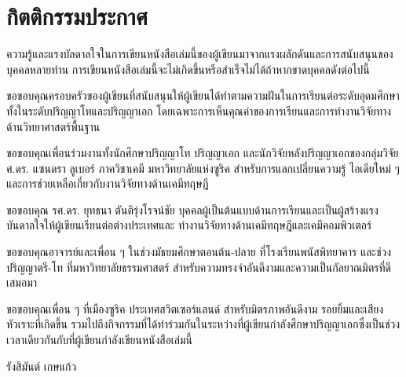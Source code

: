 

{

\chapter*{\centering กิตติกรรมประกาศ}

ความรู้และแรงบัลดาลใจในการเขียนหนังสือเล่มนี้ของผู้เขียนมาจากแรงผลักดันและการสนับสนุนของบุคคลหลายท่าน 
การเขียนหนังสือเล่มนี้จะไม่เกิดขึ้นหรือสำเร็จไม่ได้ถ้าหากขาดบุคคลดังต่อไปนี้

ขอขอบคุณครอบครัวของผู้เขียนที่สนับสนุนให้ผู้เขียนได้ทำตามความฝันในการเรียนต่อระดับอุดมศึกษา ทั้งในระดับปริญญาโทและปริญญาเอก 
โดยเฉพาะการเห็นคุณค่าของการเรียนและการทำงานวิจัยทางด้านวิทยาศาสตร์พื้นฐาน

ขอขอบคุณเพื่อนร่วมงานทั้งนักศึกษาปริญญาโท ปริญญาเอก และนักวิจัยหลังปริญญาเอกของกลุ่มวิจัย ศ.ดร. แซนดรา ลูเบอร์ ภาควิชาเคมี
มหาวิทยาลัยแห่งซูริค สำหรับการแลกเปลี่ยนความรู้ ไอเดียใหม่ ๆ และการช่วยเหลือเกี่ยวกับงานวิจัยทางด้านเคมีทฤษฎี

ขอขอบคุณ รศ.ดร. ยุทธนา ตันติรุ่งโรจน์ชัย บุคคลผู้เป็นต้นแบบด้านการเรียนและเป็นผู้สร้างแรงบันดาลใจให้ผู้เขียนเรียนต่อต่างประเทศและ%
ทำงานวิจัยทางด้านเคมีทฤษฎีและเคมีคอมพิวเตอร์

ขอขอบคุณอาจารย์และเพื่อน ๆ ในช่วงมัธยมศึกษาตอนต้น-ปลาย ที่โรงเรียนพนัสพิทยาคาร และช่วงปริญญาตรี-โท ที่มหาวิทยาลัยธรรมศาสตร์ 
สำหรับความทรงจำอันดีงามและความเป็นกัลยาณมิตรที่ดีเสมอมา

ขอขอบคุณเพื่อน ๆ ที่เมืองซูริค ประเทศสวิตเซอร์แลนด์ สำหรับมิตรภาพอันดีงาม รอยยิ้มและเสียงหัวเราะที่เกิดขึ้น 
รวมไปถึงกิจกรรมที่ได้ทำร่วมกันในระหว่างที่ผู้เขียนกำลังศึกษาปริญญาเอกซึ่งเป็นช่วงเวลาเดียวกันกับที่ผู้เขียนกำลังเขียนหนังสือเล่มนี้

\medskip

\begin{flushright}
รังสิมันต์ เกษแก้ว
\end{flushright}
}
